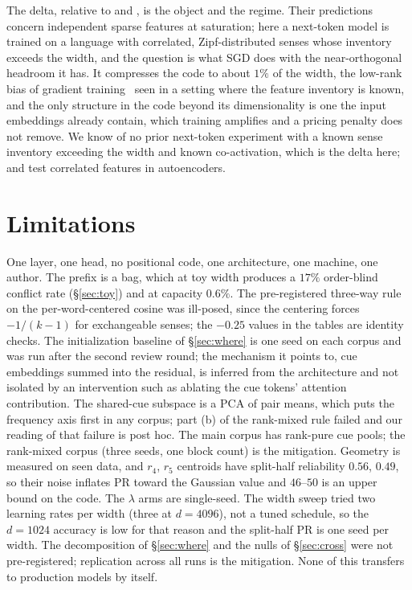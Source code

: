\documentclass{article}
\begin{document}
The delta, relative to \citet{ivanov2026spectral} and \citet{elhage2022toy}, is the
object and the regime. Their predictions concern independent sparse features at
saturation; here a next-token model is trained on a language with correlated,
Zipf-distributed senses whose inventory exceeds the width, and the question is what
SGD does with the near-orthogonal headroom it has. It compresses the code to about
$1\%$ of the width, the low-rank bias of gradient
training~\citep{papyan2020collapse,ansuini2019intrinsic,huh2023lowrank} seen in a
setting where the feature inventory is known, and the only structure in the code
beyond its dimensionality is one the input embeddings already contain, which
training amplifies and a pricing penalty does not remove. We know of no prior next-token experiment with a known
sense inventory exceeding the width and known co-activation, which is the delta
here; \citet{elhage2022toy} and \citet{scherlis2022polysemanticity} test correlated
features in autoencoders.

\section{Limitations}\label{sec:limits}

One layer, one head, no positional code, one architecture, one machine, one author.
The prefix is a bag, which at toy width produces a $17\%$ order-blind conflict rate
(\S\ref{sec:toy}) and at capacity $0.6\%$. The pre-registered three-way rule on the
per-word-centered cosine was ill-posed, since the centering forces $-1/(k{-}1)$ for
exchangeable senses; the $-0.25$ values in the tables are identity checks. The
initialization baseline of \S\ref{sec:where} is one seed on each corpus and was run
after the second review round; the mechanism it points to, cue embeddings summed
into the residual, is inferred from the architecture and not isolated by an
intervention such as ablating the cue tokens' attention contribution. The shared-cue
subspace is a PCA of pair means, which puts the frequency axis first in any corpus;
part (b) of the rank-mixed rule failed and our reading of that failure is post hoc.
The main corpus has rank-pure cue pools; the rank-mixed corpus (three seeds, one
block count) is the mitigation. Geometry is measured on seen data, and $r_4$, $r_5$
centroids have split-half reliability $0.56$, $0.49$, so their noise inflates PR
toward the Gaussian value and $46$--$50$ is an upper bound on the code. The
$\lambda$ arms are single-seed. The width sweep tried two learning rates per width
(three at $d{=}4096$), not a tuned schedule, so the $d{=}1024$ accuracy is low for
that reason and the split-half PR is one seed per width. The decomposition of \S\ref{sec:where} and the nulls of
\S\ref{sec:cross} were not pre-registered; replication across all runs is the
mitigation. None of this transfers to production models by itself.
\end{document}
